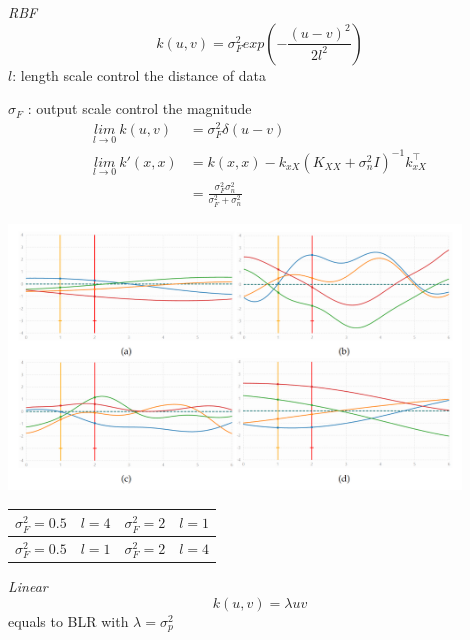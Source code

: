 \documentclass[landscape,a0paper,fontscale=0.285]{baposter} %
\begin{document}
\begin{poster}
{\textit{RBF}\vspace{-0.3cm}
$$
k(u,v) = \sigma_F^2  exp\left(-\frac{(u-v)^2}{2l^2}\right)
$$
$l$:  length scale control the distance of data

$\sigma_F$ : output scale  control  the magnitude
$$
\begin{aligned}
\underset{l\rightarrow 0}{lim}~k(u,v) &= \sigma_F^2\delta(u-v)\\
\underset{l\rightarrow 0}{lim}~k'(x,x) &= k(x,x) - k_{xX}(K_{XX}+\sigma_n^2 I)^{-1}k_{xX}^\top \\
&= \frac{\sigma_F^2\sigma_n^2}{\sigma_F^2 + \sigma_n^2}
\end{aligned}
$$
\begin{center}
\includegraphics[width=0.9\textwidth, trim={0cm 3cm 0 2cm},clip]{figures/9ZdGX6UqMPl2WkR.png}
    \begin{tabular}{c | c}
         $\sigma_F^2=0.5\quad l=4$ & $\sigma_F^2=2\quad l=1$ \\\hline
         $\sigma_F^2=0.5\quad l=1$ & $\sigma_F^2=2\quad l=4$
    \end{tabular}
\end{center}

\textit{Linear}\vspace{-0.3cm}
$$
k(u,v) = \lambda uv
$$
equals to BLR with $\lambda  = \sigma_p^2$

\begin{center}
    


\end{center}}
\end{poster}
\end{document}
